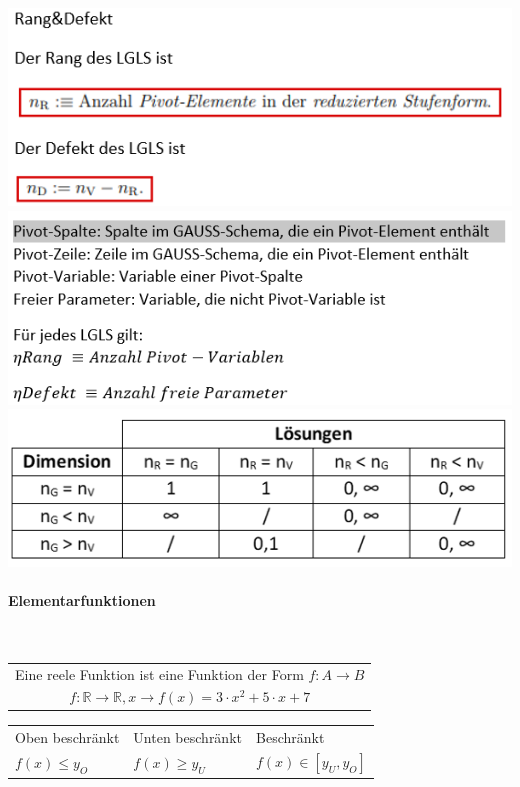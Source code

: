 \includegraphics[width=\columnwidth]{./images/lgs5.png}
\includegraphics[width=\columnwidth]{./images/lgs6.png}
\includegraphics[width=\columnwidth]{./images/lgs7.png}
\vspace{1mm}

\paragraph{Elementarfunktionen}\mbox{}\\
\noindent
\begin{tabularx}{\columnwidth}{@{}X@{}}
    \hline
    Eine reele Funktion ist eine Funktion der Form $f: A \to B$                         \\
    \[ f: \mathbb{R} \to \mathbb{R},x \rightarrow f(x) = 3 \cdot x^2 + 5 \cdot x + 7 \] \\
\end{tabularx}
\begin{tabularx}{\columnwidth}{@{}X|X|X@{}}
    Oben beschränkt & Unten beschränkt & Beschränkt           \\
    $f(x) \leq y_O$ & $f(x) \geq y_U$  & $f(x) \in [y_U,y_O]$ \\ \hline
\end{tabularx}
\vspace{1mm}

